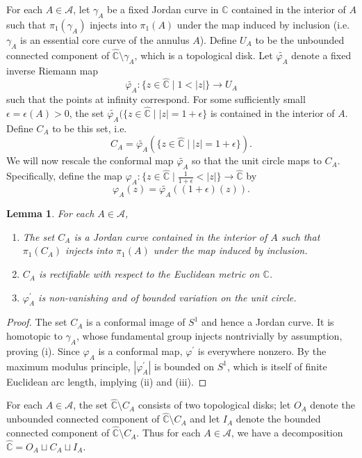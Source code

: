 \documentclass[a4paper,11pt,onecolumn]{amsart}
\newtheorem{lemma}[theorem]{Lemma}
\theoremstyle{definition}
\begin{document}
For each $A \in \mathcal{A}$, let $\gamma_A$ be a fixed Jordan curve in $\mathbb{C}$ contained in the interior of $A$ such that $\pi_1(\gamma_A)$ injects into $\pi_1(A)$ under the map induced by inclusion (i.e. $\gamma_A$ is an essential core curve of the annulus $A$).  Define $U_A$ to be the unbounded connected component of $\hat{\mathbb{C}} \setminus \gamma_A$, which is a topological disk.   Let  $\widetilde{\varphi_A}$ denote a fixed inverse Riemann map $$\widetilde{\varphi_A}: \{z \in \hat{\mathbb{C}} \mid 1 < |z| \} \rightarrow U_A$$ such that the points at infinity correspond. For some sufficiently small $\epsilon = \epsilon(A) >0$, the set $\widetilde{\varphi_A}(\{z \in \hat{\mathbb{C}} \mid |z|=1+\epsilon\}$ is contained in the interior of $A$.  Define $C_A$ to be this set, i.e. $$C_A = \widetilde{\varphi_A}(\{z \in \hat{\mathbb{C}} \mid |z|=1+\epsilon \}).$$ 
We will now rescale the conformal map $\widetilde{\varphi_A}$ so that the unit circle maps to $C_A$.  Specifically, define 
the map $\varphi_A :\{ z \in \hat{\mathbb{C}} \mid  \frac{1}{1+\epsilon} < |z| \} \rightarrow \hat{\mathbb{C}}$ by $$\varphi_A(z)=\widetilde{\varphi_A}\left((1+\epsilon)(z)\right).$$  

\begin{lemma} \label{l:CAproperties} For each $A \in \mathcal{A}$, 
\begin{enumerate}
\item The set $C_A$ is a Jordan curve contained in the interior of $A$ such that $\pi_1(C_A)$ injects into $\pi_1(A)$ under the map induced by inclusion.  
\item $C_A$ is rectifiable with respect to the Euclidean metric on $\mathbb{C}$. 
\item $\varphi_A^{\prime}$ is non-vanishing and of bounded variation on the unit circle. 
\end{enumerate}
\end{lemma}

\begin{proof}
The set $C_A$ is a conformal image of $S^1$ and hence a Jordan curve.  It is homotopic to $\gamma_A$, whose fundamental group injects nontrivially by assumption, proving (i).  Since $\varphi_A$ is a conformal map, $\varphi^{\prime}$ is everywhere nonzero.  By the maximum modulus principle, $|\varphi_A^{\prime}|$ is bounded on $S^1$, which is itself of finite Euclidean arc length, implying (ii) and (iii).    
\end{proof}

For each $A \in \mathcal{A}$, the set $\hat{\mathbb{C}} \setminus C_A$ consists of two topological disks; let $O_A$ denote the unbounded connected component of $\hat{\mathbb{C}} \setminus C_A$ and let $I_A$ denote the bounded connected component of $\hat{\mathbb{C}} \setminus C_A$.  Thus for each $A \in \mathcal{A}$, we have a decomposition $\hat{\mathbb{C}} = O_A \sqcup C_A \sqcup I_A.$
\end{document}
